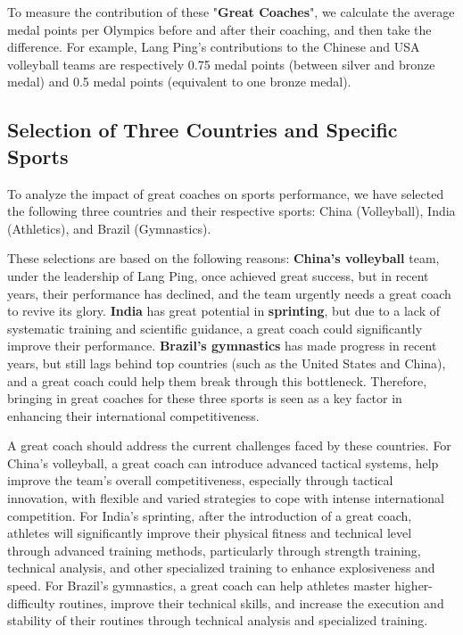 \documentclass{mcmthesis}  %
\begin{document}
To measure the contribution of these "\textbf{Great Coaches}", we calculate the average medal points per Olympics before and after their coaching, and then take the difference. For example, Lang Ping's contributions to the Chinese and USA volleyball teams are respectively 0.75 medal points (between silver and bronze medal) and 0.5 medal points (equivalent to one bronze medal).


\subsection{Selection of Three Countries and Specific Sports}

To analyze the impact of great coaches on sports performance, we have selected the following three countries and their respective sports: China (Volleyball), India (Athletics), and Brazil (Gymnastics).

These selections are based on the following reasons:\textbf{ China's volleyball} team, under the leadership of Lang Ping, once achieved great success, but in recent years, their performance has declined, and the team urgently needs a great coach to revive its glory.\textbf{ India} has great potential in \textbf{sprinting}, but due to a lack of systematic training and scientific guidance, a great coach could significantly improve their performance.\textbf{ Brazil's gymnastics} has made progress in recent years, but still lags behind top countries (such as the United States and China), and a great coach could help them break through this bottleneck. Therefore, bringing in great coaches for these three sports is seen as a key factor in enhancing their international competitiveness.

A great coach should address the current challenges faced by these countries. For China’s volleyball, a great coach can introduce advanced tactical systems, help improve the team's overall competitiveness, especially through tactical innovation, with flexible and varied strategies to cope with intense international competition. For India’s sprinting, after the introduction of a great coach, athletes will significantly improve their physical fitness and technical level through advanced training methods, particularly through strength training, technical analysis, and other specialized training to enhance explosiveness and speed. For Brazil’s gymnastics, a great coach can help athletes master higher-difficulty routines, improve their technical skills, and increase the execution and stability of their routines through technical analysis and specialized training.
\end{document}
